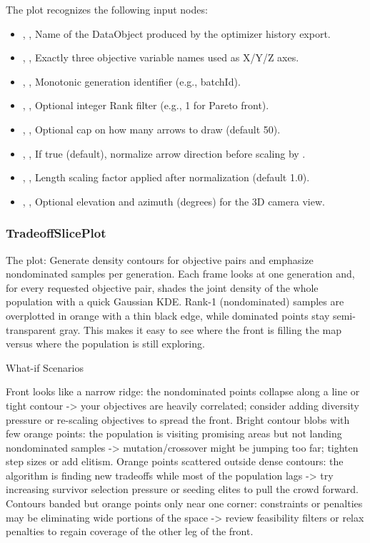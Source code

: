 The  plot recognizes the following input nodes:
\begin{itemize}
  \item {}, , Name of the DataObject produced by the optimizer history export.
  \item {}, , Exactly three objective variable names used as X/Y/Z axes.
  \item {}, , Monotonic generation identifier (e.g., batchId).
  \item {}, , Optional integer Rank filter (e.g., 1 for Pareto front).
  \item {}, , Optional cap on how many arrows to draw (default 50).
  \item {}, , If true (default), normalize arrow direction before scaling by .
  \item {}, , Length scaling factor applied after normalization (default 1.0).
  \item {}, , Optional elevation and azimuth (degrees) for the 3D camera view.
\end{itemize}

\subsubsection{TradeoffSlicePlot}
The   plot: Generate density contours for objective pairs and emphasize nondominated samples per generation. Each frame looks at one generation and, for every requested objective pair, shades the joint density of the whole population with a quick Gaussian KDE. Rank-1 (nondominated) samples are overplotted in orange with a thin black edge, while dominated points stay semi-transparent gray. This makes it easy to see where the front is filling the map versus where the population is still exploring.

What-if Scenarios

Front looks like a narrow ridge: the nondominated points collapse along a line or tight contour -\textgreater{} your objectives are heavily correlated; consider adding diversity pressure or re-scaling objectives to spread the front. Bright contour blobs with few orange points: the population is visiting promising areas but not landing nondominated samples -\textgreater{} mutation/crossover might be jumping too far; tighten step sizes or add elitism. Orange points scattered outside dense contours: the algorithm is finding new tradeoffs while most of the population lags -\textgreater{} try increasing survivor selection pressure or seeding elites to pull the crowd forward. Contours banded but orange points only near one corner: constraints or penalties may be eliminating wide portions of the space -\textgreater{} review feasibility filters or relax penalties to regain coverage of the other leg of the front.

